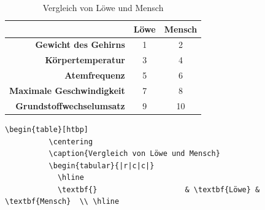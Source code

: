 \begin{frame}[fragile]
    \vspace{-0.2cm}
    \Losung
    \vspace{-0.1cm}
	\begin{outputbox}
        \vspace{-0.4cm}
		\begin{center}
            \begin{table}[htbp] 
                \centering
                \caption{Vergleich von Löwe und Mensch}
                \vspace{-0.4cm}
                \begin{tabular}{|r|c|c|}
                    \hline 
                    \textbf{}                         & \textbf{Löwe} & \textbf{Mensch}  \\ \hline 
                    \textbf{Gewicht des Gehirns}      & 1             & 2                \\ \hline 
                    \textbf{Körpertemperatur}         & 3             & 4                \\ \hline 
                    \textbf{Atemfrequenz}             & 5             & 6                \\ \hline 
                    \textbf{Maximale Geschwindigkeit} & 7             & 8                \\ \hline 
                    \textbf{Grundstoffwechselumsatz}  & 9             & 10               \\ \hline
                \end{tabular} 
                \label{}
            \end{table}
		\end{center}
        \vspace{-0.4cm}
	\end{outputbox}
    \vspace{-0.2cm}
    \Code
    \vspace{-0.1cm}
	\begin{lstlisting}[gobble=8]
        \begin{table}[htbp]
          \centering
          \caption{Vergleich von Löwe und Mensch}
          \begin{tabular}{|r|c|c|}
            \hline 
            \textbf{}                    & \textbf{Löwe} & \textbf{Mensch}  \\ \hline 

\end{lstlisting}
\end{frame}
